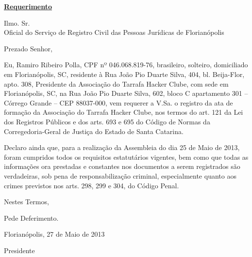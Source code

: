 \documentclass[a4paper]{article}
\begin{document}
\begin{center}
 \textbf{\underline{Requerimento}}
\end{center}

\hfill

\noindent Ilmo. Sr. \\
Oficial do Serviço de Registro Civil das Pessoas Jurídicas de Florianópolis

\hfill

\noindent Prezado Senhor,

\hfill

Eu, Ramiro Ribeiro Polla, CPF nº 046.068.819-76, brasileiro, solteiro,
domiciliado em Florianópolis, SC, residente à
Rua João Pio Duarte Silva, 404, bl. Beija-Flor, apto. 308,
Presidente da Associação do Tarrafa Hacker Clube,
com sede em Florianópolis, SC, na
Rua João Pio Duarte Silva, 602, bloco C apartamento 301 – Córrego Grande – CEP 88037-000,
vem requerer a V.Sa. o registro da ata de formação da Associação do Tarrafa Hacker Clube,
nos termos do art. 121 da Lei dos Registros Públicos e dos arts. 693 e 695
do Código de Normas da Corregedoria-Geral de Justiça do Estado de Santa Catarina.

Declaro ainda que, para a realização da Assembleia do dia 25 de Maio de 2013,
foram cumpridos todos os requisitos estatutários vigentes, bem como que
todas as informações ora prestadas e constantes nos documentos a serem registrados são
verdadeiras, sob pena de responsabilização criminal, especialmente quanto aos crimes
previstos nos arts. 298, 299 e 304, do Código Penal.

\hfill

Nestes Termos,

Pede Deferimento.

Florianópolis, 27 de Maio de 2013

\vspace{2cm}

\begin{center}
\makebox[7cm]{\hrulefill}

Presidente

\vspace{3cm}
\end{center}
\end{document}

